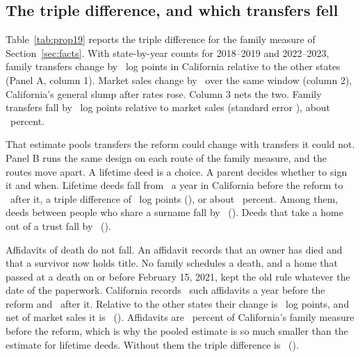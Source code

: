 \subsection{The triple difference, and which transfers fell}\label{subsec:ddd}

Table~\ref{tab:prop19} reports the triple difference for the family measure of Section~\ref{sec:facts}. With state-by-year counts for 2018--2019 and 2022--2023, family transfers change by \PolicyFamilyLog\ log points in California relative to the other states (Panel A, column 1). Market sales change by \PolicyMarketLog\ over the same window (column 2), California's general slump after rates rose. Column 3 nets the two. Family transfers fall by \PRouteAllDDD\ log points relative to market sales (standard error \PRouteAllDDDSE), about \PRouteAllPct\ percent.



That estimate pools transfers the reform could change with transfers it could not. Panel B runs the same design on each route of the family measure, and the routes move apart. A lifetime deed is a choice. A parent decides whether to sign it and when. Lifetime deeds fall from \PRouteLifePre\ a year in California before the reform to \PRouteLifePost\ after it, a triple difference of \PRouteLifeDDD\ log points (\PRouteLifeDDDSE), or about \PRouteLifePct\ percent. Among them, deeds between people who share a surname fall by \PRouteLifeSurDDD\ (\PRouteLifeSurDDDSE). Deeds that take a home out of a trust fall by \PRouteTrustDDD\ (\PRouteTrustDDDSE).

Affidavits of death do not fall. An affidavit records that an owner has died and that a survivor now holds title. No family schedules a death, and a home that passed at a death on or before February 15, 2021, kept the old rule whatever the date of the paperwork. California records \PRouteAffPre\ such affidavits a year before the reform and \PRouteAffPost\ after it. Relative to the other states their change is \PRouteAffDiD\ log points, and net of market sales it is \PRouteAffDDD\ (\PRouteAffDDDSE). Affidavits are \PRouteAffShare\ percent of California's family measure before the reform, which is why the pooled estimate is so much smaller than the estimate for lifetime deeds. Without them the triple difference is \PRouteNoAffDDD\ (\PRouteNoAffDDDSE).

